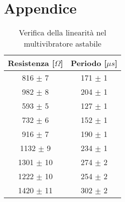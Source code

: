 \newpage
\section{Appendice}
\begin{table}[hb]
	\centering
\begin{tabular}{c c} 
	\toprule
	Resistenza [$\Omega $] & Periodo [$\mu s$]\\
	\midrule
	816 $\pm$ 7 & 171 $\pm$ 1\\
	982 $\pm$ 8 & 204 $\pm$ 1\\
	593 $\pm$ 5 & 127 $\pm$ 1\\
	732 $\pm$ 6 & 152 $\pm$ 1\\
	916 $\pm$ 7 & 190 $\pm$ 1\\
	1132 $\pm$ 9 & 234 $\pm$ 1\\
	1301 $\pm$ 10 & 274 $\pm$ 2\\
	1222 $\pm$ 10 & 254 $\pm$ 2\\
	1420 $\pm$ 11 & 302 $\pm$ 2\\
	\bottomrule
\end{tabular}
\caption{Verifica della linearità nel multivibratore astabile}
	\label{astab_data}
\end{table}